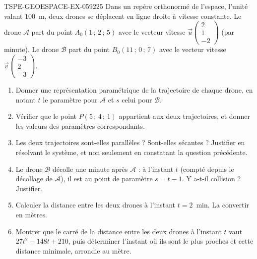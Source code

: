 \begin{exercice}{TSPE-GEOESPACE-EX-059}{2}{25}
Dans un repère orthonormé de l'espace, l'unité valant $100$~m, deux drones se
déplacent en ligne droite à vitesse constante. Le drone $\mathcal{A}$ part du
point $A_0(1\,;\,2\,;\,5)$ avec le vecteur vitesse
$\vec{u}\begin{pmatrix}2\\1\\-2\end{pmatrix}$ (par minute). Le drone
$\mathcal{B}$ part du point $B_0(11\,;\,0\,;\,7)$ avec le vecteur vitesse
$\vec{v}\begin{pmatrix}-3\\2\\-3\end{pmatrix}$.
\begin{enumerate}
  \item Donner une représentation paramétrique de la trajectoire de chaque drone,
    en notant $t$ le paramètre pour $\mathcal{A}$ et $s$ celui pour
    $\mathcal{B}$.
  \item Vérifier que le point $P(5\,;\,4\,;\,1)$ appartient aux deux
    trajectoires, et donner les valeurs des paramètres correspondants.
  \item Les deux trajectoires sont-elles parallèles ? Sont-elles sécantes ?
    Justifier en résolvant le système, et non seulement en constatant la
    question précédente.
  \item Le drone $\mathcal{B}$ décolle une minute après $\mathcal{A}$ : à
    l'instant $t$ (compté depuis le décollage de $\mathcal{A}$), il est au point
    de paramètre $s=t-1$. Y a-t-il collision ? Justifier.
  \item Calculer la distance entre les deux drones à l'instant $t=2$~min. La
    convertir en mètres.
  \item Montrer que le carré de la distance entre les deux drones à l'instant
    $t$ vaut $27t^2-148t+210$, puis déterminer l'instant où ils sont le plus
    proches et cette distance minimale, arrondie au mètre.
\end{enumerate}
\end{exercice}
